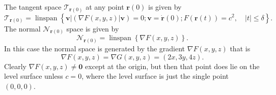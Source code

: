 \documentclass[aps,preprint]{revtex4}%
\begin{document}
The tangent space $\mathcal{T}_{\mathbf{r}\left(  0\right)  }$ at any point
$\mathbf{r}\left(  0\right)  $ is given by
\begin{equation}
\mathcal{T}_{\mathbf{r}\left(  0\right)  }=\operatorname{linspan}\left\{
\left.  \mathbf{v}\right\vert \left(  \left.  \nabla F\left(  x,y,z\right)
\right\vert \mathbf{v}\right)  =0;\mathbf{v=\dot{r}}\left(  0\right)
;F\left(  \mathbf{r}\left(  t\right)  \right)  =c^{2}\mathbf{,\quad}\left\vert
t\right\vert \leq\delta\right\}  .
\end{equation}
The normal $\mathcal{N}_{\mathbf{r}\left(  0\right)  }$ space is given by
\begin{equation}
\mathcal{N}_{\mathbf{r}\left(  0\right)  }=\operatorname{linspan}\left\{
\nabla F\left(  x,y,z\right)  \right\}  .
\end{equation}
In this case the normal space is generated by the gradient $\nabla F\left(
x,y,z\right)  $ that is
\begin{equation}
\nabla F\left(  x,y,z\right)  =\nabla G\left(  x,y,z\right)  =\left(
2x,3y,4z\right)  .
\end{equation}
Clearly $\nabla F\left(  x,y,z\right)  \neq\mathbf{0}$ except at the origin,
but then that point does lie on the level surface unless $c=0$, where the
level surface is just the single point $\left(  0,0,0\right)  .$
\end{document}
